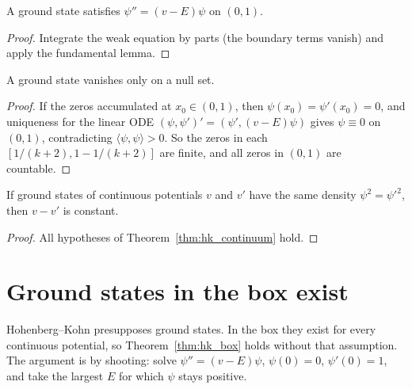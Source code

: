 \begin{lemma}
  \label{lem:box_ode}
  \leanok
  A ground state satisfies $\psi''=(v-E)\psi$ on $(0,1)$.
\end{lemma}
\begin{proof}
  \leanok
  Integrate the weak equation by parts (the boundary terms vanish) and apply the fundamental lemma.
\end{proof}

\begin{theorem}
  \label{thm:box_ucp}
  \leanok
  A ground state vanishes only on a null set.
\end{theorem}
\begin{proof}
  \leanok
  If the zeros accumulated at $x_0\in(0,1)$, then $\psi(x_0)=\psi'(x_0)=0$, and uniqueness for the linear ODE
  $(\psi,\psi')'=(\psi',(v-E)\psi)$ gives $\psi\equiv0$ on $(0,1)$, contradicting $\langle\psi,\psi\rangle>0$. So the
  zeros in each $[1/(k+2),1-1/(k+2)]$ are finite, and all zeros in $(0,1)$ are countable.
\end{proof}

\begin{theorem}
  \label{thm:hk_box}
  \leanok
  If ground states of continuous potentials $v$ and $v'$ have the same density $\psi^2=\psi'^2$, then $v-v'$ is
  constant.
\end{theorem}
\begin{proof}
  \leanok
  All hypotheses of Theorem~\ref{thm:hk_continuum} hold.
\end{proof}

\section{Ground states in the box exist}

Hohenberg--Kohn presupposes ground states. In the box they exist for every continuous potential, so
Theorem~\ref{thm:hk_box} holds without that assumption. The argument is by shooting: solve
$\psi''=(v-E)\psi$, $\psi(0)=0$, $\psi'(0)=1$, and take the largest $E$ for which $\psi$ stays positive.

